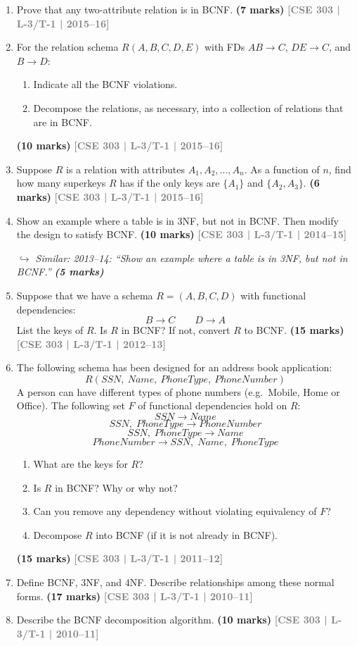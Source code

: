 \documentclass[12pt]{article}
\newcommand{\yr}[1]{\hfill\textcolor{gray}{\small\textbf{[#1]}}}
\newcommand{\mk}[1]{\textcolor{orange!70!black}{\small\textbf{(#1 marks)}}}
\newcommand{\variant}[1]{\par\vspace{1pt}\textcolor{blue!50!black}%
  {\footnotesize\textit{$\hookrightarrow$ Similar: #1}}}
\begin{document}
\begin{enumerate}
\item Prove that any two-attribute relation is in BCNF.
\mk{7} \yr{CSE 303 | L-3/T-1 | 2015--16}


\item For the relation schema $R(A, B, C, D, E)$ with FDs $AB \to C$, $DE \to C$, and $B \to D$:
\begin{enumerate}
  \item Indicate all the BCNF violations.
  \item Decompose the relations, as necessary, into a collection of relations that are in BCNF.
\end{enumerate}
\mk{10} \yr{CSE 303 | L-3/T-1 | 2015--16}


\item Suppose $R$ is a relation with attributes $A_1, A_2, \ldots, A_n$. As a function of $n$, find how many superkeys $R$ has if the only keys are $\{A_1\}$ and $\{A_2, A_3\}$.
\mk{6} \yr{CSE 303 | L-3/T-1 | 2015--16}


\item Show an example where a table is in 3NF, but not in BCNF. Then modify the design to satisfy BCNF.
\mk{10} \yr{CSE 303 | L-3/T-1 | 2014--15}
\variant{2013--14: ``Show an example where a table is in 3NF, but not in BCNF.'' \mk{5}}


\item Suppose that we have a schema $R = (A, B, C, D)$ with functional dependencies:
\[B \to C \qquad D \to A\]
List the keys of $R$. Is $R$ in BCNF? If not, convert $R$ to BCNF.
\mk{15} \yr{CSE 303 | L-3/T-1 | 2012--13}


\item The following schema has been designed for an address book application:
\[R(SSN,\ Name,\ PhoneType,\ PhoneNumber)\]
A person can have different types of phone numbers (e.g.\ Mobile, Home or Office). The following set $F$ of functional dependencies hold on $R$:
\[SSN \to Name\]
\[SSN,\;PhoneType \to PhoneNumber\]
\[SSN,\;PhoneType \to Name\]
\[PhoneNumber \to SSN,\;Name,\;PhoneType\]
\begin{enumerate}
  \item What are the keys for $R$?
  \item Is $R$ in BCNF? Why or why not?
  \item Can you remove any dependency without violating equivalency of $F$?
  \item Decompose $R$ into BCNF (if it is not already in BCNF).
\end{enumerate}
\mk{15} \yr{CSE 303 | L-3/T-1 | 2011--12}


\item Define BCNF, 3NF, and 4NF. Describe relationships among these normal forms.
\mk{17} \yr{CSE 303 | L-3/T-1 | 2010--11}


\item Describe the BCNF decomposition algorithm.
\mk{10} \yr{CSE 303 | L-3/T-1 | 2010--11}


\end{enumerate}
\end{document}
